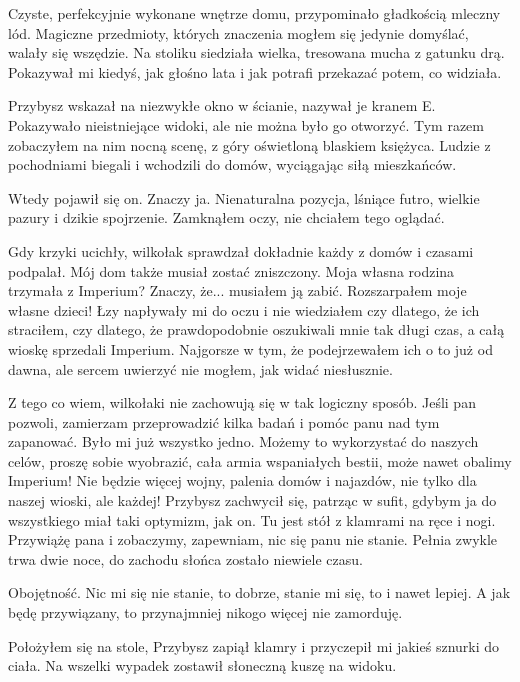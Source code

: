 Czyste, perfekcyjnie wykonane wnętrze domu, przypominało gładkością mleczny lód.
Magiczne przedmioty, których znaczenia mogłem się jedynie domyślać, walały się wszędzie.
Na stoliku siedziała wielka, tresowana mucha z gatunku drą. Pokazywał mi kiedyś, jak głośno lata i jak potrafi przekazać potem, co widziała.

Przybysz wskazał na niezwykłe okno w ścianie, nazywał je kranem E.
Pokazywało nieistniejące widoki, ale nie można było go otworzyć.
Tym razem zobaczyłem na nim nocną scenę, z góry oświetloną blaskiem księżyca. 
Ludzie z pochodniami biegali i wchodzili do domów, wyciągając siłą mieszkańców.

Wtedy pojawił się on. Znaczy ja.
Nienaturalna pozycja, lśniące futro, wielkie pazury i dzikie spojrzenie.
Zamknąłem oczy, nie chciałem tego oglądać.

Gdy krzyki ucichły, wilkołak sprawdzał dokładnie każdy z domów i czasami podpalał.
Mój dom także musiał zostać zniszczony. Moja własna rodzina trzymała z Imperium? 
Znaczy, że... musiałem ją zabić. Rozszarpałem moje własne dzieci!
Łzy napływały mi do oczu i nie wiedziałem czy dlatego, że ich straciłem, czy dlatego, że prawdopodobnie oszukiwali mnie tak długi czas, a całą wioskę sprzedali Imperium.
Najgorsze w tym, że podejrzewałem ich o to już od dawna, ale sercem uwierzyć nie mogłem, jak widać niesłusznie.

\begin{dialogue}
\ds{} Z tego co wiem, wilkołaki nie zachowują się w tak logiczny sposób.
Jeśli pan pozwoli, zamierzam przeprowadzić kilka badań i pomóc panu nad tym zapanować.
\dm{} Było mi już wszystko jedno.
\dm{} Możemy to wykorzystać do naszych celów, proszę sobie wyobrazić, cała armia wspaniałych bestii, może nawet obalimy Imperium!
Nie będzie więcej wojny, palenia domów i najazdów, nie tylko dla naszej wioski, ale każdej! \dm{} 
Przybysz zachwycił się, patrząc w sufit, gdybym ja do wszystkiego miał taki optymizm, jak on.
\dm{} Tu jest stół z klamrami na ręce i nogi.
Przywiążę pana i zobaczymy, zapewniam, nic się panu nie stanie.
Pełnia zwykle trwa dwie noce, do zachodu słońca zostało niewiele czasu.
\end{dialogue}

Obojętność.
Nic mi się nie stanie, to dobrze, stanie mi się, to i nawet lepiej.
A jak będę przywiązany, to przynajmniej nikogo więcej nie zamorduję.

Położyłem się na stole, Przybysz zapiął klamry i przyczepił mi jakieś sznurki do ciała.
Na wszelki wypadek zostawił słoneczną kuszę na widoku.


